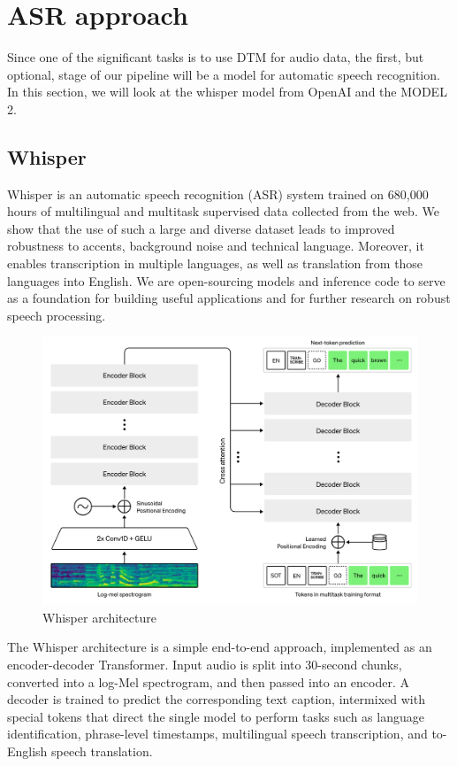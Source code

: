 \documentclass[PMI,VKR]{HSEUniversity}
\begin{document}
\section{ASR approach}

Since one of the significant tasks is to use DTM for audio data, the first, but optional, stage of our pipeline will be a model for automatic speech recognition. 
In this section, we will look at the whisper model from OpenAI and the MODEL 2.

\subsection{Whisper}


Whisper is an automatic speech recognition (ASR) system trained on 680,000 hours of multilingual and multitask supervised data collected from the web. 
We show that the use of such a large and diverse dataset leads to improved robustness to accents, background noise and technical language. Moreover, it enables transcription in multiple languages, as well as translation from those languages into English. 
We are open-sourcing models and inference code to serve as a foundation for building useful applications and for further research on robust speech processing.

\begin{figure}[h]
    \centering
    \includegraphics[scale=0.7  ]{img/whisper.png}
    \caption{Whisper architecture}
\end{figure}

The Whisper architecture is a simple end-to-end approach, implemented as an encoder-decoder Transformer. 
Input audio is split into 30-second chunks, converted into a log-Mel spectrogram, and then passed into an encoder. 
A decoder is trained to predict the corresponding text caption, intermixed with special tokens that direct the single model to perform tasks such as language identification, phrase-level timestamps, multilingual speech transcription, and to-English speech translation.
\end{document}
